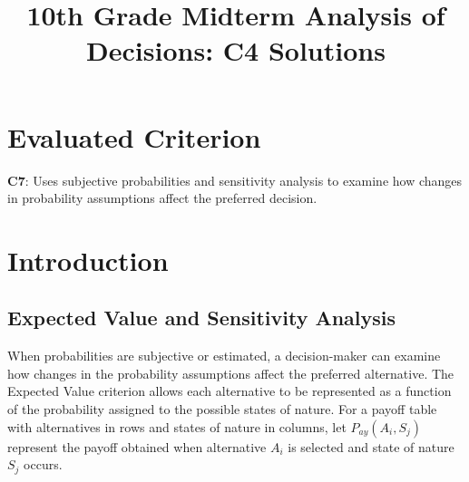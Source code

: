 \makeatletter
{}
\makeatother

%


\title{10th Grade Midterm Analysis of Decisions: C4 Solutions}
\author{}
\date{}


\pagestyle{empty}


	
	\maketitle
	\setcounter{tocdepth}{1}
	\setcounter{secnumdepth}{2}
	\label{toc}
	\vspace*{-20mm}
	\tableofcontents
	
	\section*{Evaluated Criterion}
	
	\textbf{C7}: Uses subjective probabilities and sensitivity analysis to examine how
	changes in probability assumptions affect the preferred decision.
	
	\section{Introduction}\label{sec:c4-introduction}
	\vspace{8mm}
	
	\subsection{Expected Value and Sensitivity Analysis}\label{sec:c4-intro-expected-value}

	
	When probabilities are subjective or estimated, a decision-maker can
	examine how changes in the probability assumptions affect the preferred
	alternative. The Expected Value criterion allows each alternative to be
	represented as a function of the probability assigned to the possible
	states of nature. For a payoff table with alternatives in rows and states of nature in columns, let
	$
	P_{ay}(A_i,S_j)
	$
	represent the payoff obtained when alternative $A_i$ is selected and
	state of nature $S_j$ occurs.
	
